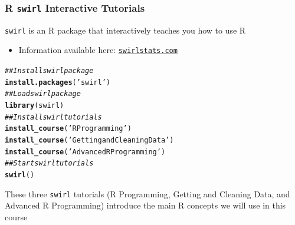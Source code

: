 \documentclass{beamer}\usepackage[]{graphicx}\usepackage[]{xcolor}
\makeatletter
\newcommand{\hlstr}[1]{\textcolor[rgb]{0.192,0.494,0.8}{#1}}%
\newcommand{\hlcom}[1]{\textcolor[rgb]{0.678,0.584,0.686}{\textit{#1}}}%
\newcommand{\hlstd}[1]{\textcolor[rgb]{0.345,0.345,0.345}{#1}}%
\newcommand{\hlkwd}[1]{\textcolor[rgb]{0.737,0.353,0.396}{\textbf{#1}}}%
\newenvironment{kframe}{%
 \def\at@end@of@kframe{}%
 \ifinner\ifhmode%
  \def\at@end@of@kframe{\end{minipage}}%
  \begin{minipage}{\columnwidth}%
 \fi\fi%
 \def\FrameCommand##1{\hskip\@totalleftmargin \hskip-\fboxsep
 \colorbox{shadecolor}{##1}\hskip-\fboxsep
     \hskip-\linewidth \hskip-\@totalleftmargin \hskip\columnwidth}%
 \MakeFramed {\advance\hsize-\width
   \@totalleftmargin\z@ \linewidth\hsize
   \@setminipage}}%
 {\par\unskip\endMakeFramed%
 \at@end@of@kframe}
\newenvironment{knitrout}{}{} %
\makeatother
\begin{document}

\begin{frame}[fragile]\frametitle{R \texttt{swirl} Interactive Tutorials}
    \texttt{swirl} is an R package that interactively teaches you how to use R
    \begin{itemize}
    	\item Information available here: \href{https://swirlstats.com/}{\texttt{swirlstats.com}}
    \end{itemize}
    \vspace{2ex}
\begin{knitrout}\footnotesize
{}\color{fgcolor}\begin{kframe}
\begin{alltt}
\hlcom{## Install swirl package}
\hlkwd{install.packages}\hlstd{(}\hlstr{'swirl'}\hlstd{)}
\hlcom{## Load swirl package}
\hlkwd{library}\hlstd{(swirl)}
\hlcom{## Install swirl tutorials}
\hlkwd{install_course}\hlstd{(}\hlstr{'R Programming'}\hlstd{)}
\hlkwd{install_course}\hlstd{(}\hlstr{'Getting and Cleaning Data'}\hlstd{)}
\hlkwd{install_course}\hlstd{(}\hlstr{'Advanced R Programming'}\hlstd{)}
\hlcom{## Start swirl tutorials}
\hlkwd{swirl}\hlstd{()}
\end{alltt}
\end{kframe}
\end{knitrout}
    \vspace{2ex}
    These three \texttt{swirl} tutorials (R Programming, Getting and Cleaning Data, and Advanced R Programming) introduce the main R concepts we will use in this course
\end{frame}
\end{document}
